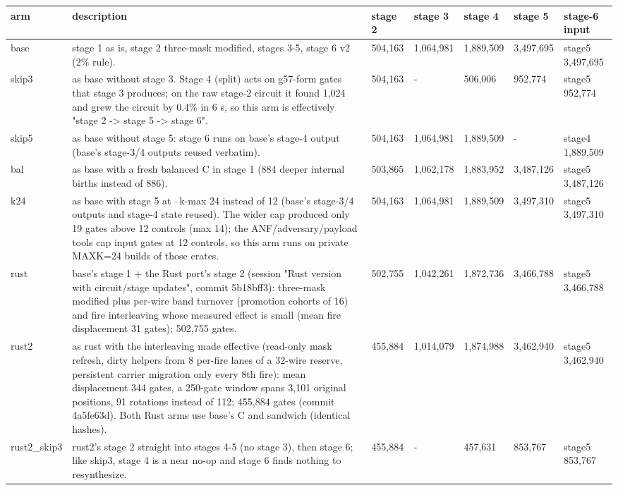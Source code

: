 \documentclass[10pt,a4paper]{article}
\begin{document}
{\small\setlength{\tabcolsep}{2pt}\begin{longtable}{|p{1.1cm}|p{9.0cm}|p{1.1cm}|p{1.1cm}|p{1.1cm}|p{1.1cm}|p{1.35cm}|}\hline
\textbf{arm} & \textbf{description} & \textbf{stage 2} & \textbf{stage 3} & \textbf{stage 4} & \textbf{stage 5} & \textbf{stage-6 input}\\\hline\endhead
base & stage 1 as is, stage 2 three-mask modified, stages 3-5, stage 6 v2 (2\% rule). & 504,163 & 1,064,981 & 1,889,509 & 3,497,695 & stage5 3,497,695\\\hline
skip3 & as base without stage 3. Stage 4 (split) acts on g57-form gates that stage 3 produces; on the raw stage-2 circuit it found 1,024 and grew the circuit by 0.4\% in 6 s, so this arm is effectively "stage 2 -\textgreater{} stage 5 -\textgreater{} stage 6". & 504,163 & - & 506,006 & 952,774 & stage5 952,774\\\hline
skip5 & as base without stage 5: stage 6 runs on base's stage-4 output (base's stage-3/\allowbreak{}4 outputs reused verbatim). & 504,163 & 1,064,981 & 1,889,509 & - & stage4 1,889,509\\\hline
bal & as base with a fresh balanced C in stage 1 (884 deeper internal births instead of 886). & 503,865 & 1,062,178 & 1,883,952 & 3,487,126 & stage5 3,487,126\\\hline
k24 & as base with stage 5 at --k-max 24 instead of 12 (base's stage-3/\allowbreak{}4 outputs and stage-4 state reused). The wider cap produced only 19 gates above 12 controls (max 14); the ANF/\allowbreak{}adversary/\allowbreak{}payload tools cap input gates at 12 controls, so this arm runs on private MAXK=24 builds of those crates. & 504,163 & 1,064,981 & 1,889,509 & 3,497,310 & stage5 3,497,310\\\hline
rust & base's stage 1 + the Rust port's stage 2 (session "Rust version with circuit/\allowbreak{}stage updates", commit 5b18bff3): three-mask modified plus per-wire band turnover (promotion cohorts of 16) and fire interleaving whose measured effect is small (mean fire displacement 31 gates); 502,755 gates. & 502,755 & 1,042,261 & 1,872,736 & 3,466,788 & stage5 3,466,788\\\hline
rust2 & as rust with the interleaving made effective (read-only mask refresh, dirty helpers from 8 per-fire lanes of a 32-wire reserve, persistent carrier migration only every 8th fire): mean displacement 344 gates, a 250-gate window spans 3,101 original positions, 91 rotations instead of 112; 455,884 gates (commit 4a5fe63d). Both Rust arms use base's C and sandwich (identical hashes). & 455,884 & 1,014,079 & 1,874,988 & 3,462,940 & stage5 3,462,940\\\hline
rust2\_skip3 & rust2's stage 2 straight into stages 4-5 (no stage 3), then stage 6; like skip3, stage 4 is a near no-op and stage 6 finds nothing to resynthesize. & 455,884 & - & 457,631 & 853,767 & stage5 853,767\\\hline
\end{longtable}}
\end{document}
